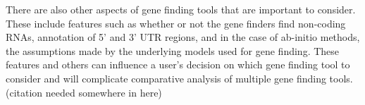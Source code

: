 There are also other aspects of gene finding tools that are important
to consider. These include features such as whether or not the gene
finders find non-coding RNAs, annotation of 5' and 3' UTR regions, and
in the case of ab-initio methods, the assumptions made by the
underlying models used for gene finding. These features and others can
influence a user's decision on which gene finding tool to consider and
will complicate comparative analysis of multiple gene finding
tools. (citation needed somewhere in here)


